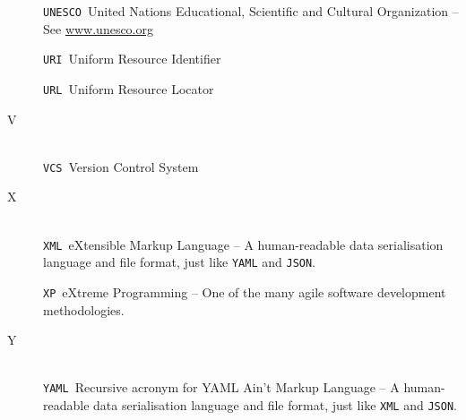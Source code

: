 \begin{description}
\verb|UNESCO|\quad~United Nations Educational, Scientific and Cultural Organization -- See \url{www.unesco.org}

\verb|URI|\quad~Uniform Resource Identifier

\verb|URL|\quad~Uniform Resource Locator


\item[V]~\\
\verb|VCS|\quad~Version Control System

\item[X]~\\
\verb|XML|\quad~eXtensible Markup Language -- A human-readable data serialisation language and file format, just like \verb|YAML| and \verb|JSON|.

\verb|XP|\quad~eXtreme Programming -- One of the many agile software development methodologies.


\item[Y]~\\
\verb|YAML|\quad~Recursive acronym for YAML Ain't Markup Language -- A human-readable data serialisation language and file format, just like \verb|XML| and \verb|JSON|.

\end{description}
